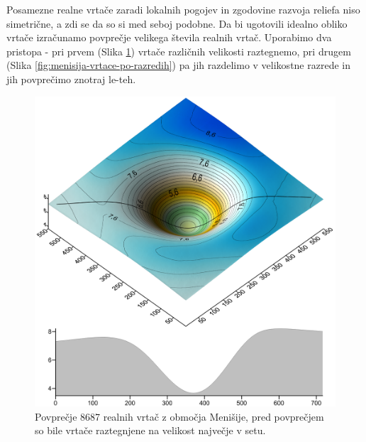 \documentclass[a4paper, oneside, 12pt]{book}
\begin{document}
Posamezne realne vrtače zaradi lokalnih pogojev in zgodovine razvoja reliefa niso simetrične, a zdi se da so si med seboj podobne. Da bi ugotovili idealno obliko vrtače izračunamo povprečje velikega števila realnih vrtač. Uporabimo dva pristopa - pri prvem (Slika \ref{fig:menisija-vrtaca}) vrtače različnih velikosti raztegnemo, pri drugem (Slika \ref{fig:menisija-vrtace-po-razredih}) pa jih razdelimo v velikostne razrede in jih povprečimo znotraj le-teh. 

\begin{figure}[H]
  \centering
  \includegraphics[width=13cm]{slike/menisija-vrtaca}
  \caption{Povprečje 8687 realnih vrtač z območja Menišije, pred povprečjem so bile vrtače raztegnjene na velikost največje v setu.}
  \label{fig:menisija-vrtaca}
\end{figure}
\end{document}
